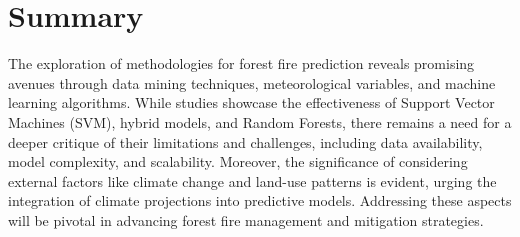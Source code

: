 \section{Summary}
\label{sec:into_back}
The exploration of methodologies for forest fire prediction reveals promising avenues through data mining techniques, 
meteorological variables, and machine learning algorithms. 
While studies showcase the effectiveness of Support Vector Machines (SVM), hybrid models, and Random Forests, there 
remains a need for a deeper critique of their limitations and 
challenges, including data availability, model complexity, 
and scalability. Moreover, the significance of considering 
external factors like climate change and land-use patterns is
evident, urging the integration of climate projections into 
predictive models. Addressing these aspects will be pivotal 
in advancing forest fire management and mitigation strategies.









